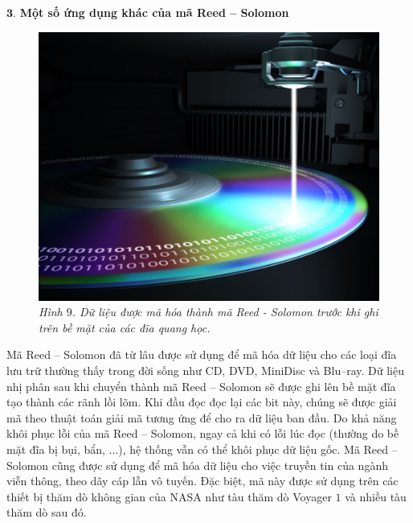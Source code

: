 \begin{multicols}{2}
\begin{figure}[H]
		\vspace*{-10pt}
	\end{figure}
	$\pmb{3.}$ \textbf{\color{toanhocdoisong}Một số ứng dụng khác của mã Reed -- Solomon}
	\begin{figure}[H]
		\vspace*{-5pt}
		\centering
		\captionsetup{labelformat= empty, justification=centering}
		\includegraphics[width= 1\linewidth]{17}
		\caption{\small\textit{\color{toanhocdoisong}Hình $9$. Dữ liệu được mã hóa thành mã Reed - Solomon trước khi ghi trên bề mặt của các đĩa quang học.}}
		\vspace*{-10pt}
	\end{figure}
	Mã Reed -- Solomon đã từ lâu được sử dụng để mã hóa dữ liệu cho các loại đĩa lưu trữ thường thấy trong đời sống như CD, DVD, MiniDisc và Blu--ray. Dữ liệu nhị phân sau khi chuyển thành mã Reed -- Solomon sẽ được ghi lên bề mặt đĩa tạo thành các rãnh lồi lõm. Khi đầu đọc đọc lại các bit này, chúng sẽ được giải mã theo thuật toán giải mã tương ứng để cho ra dữ liệu ban đầu. Do khả năng khôi phục lỗi của mã Reed -- Solomon, ngay cả khi có lỗi lúc đọc (thường do bề mặt đĩa bị bụi, bẩn, ...), hệ thống vẫn có thể khôi phục dữ liệu gốc.
	\vskip 0.1cm
	Mã Reed -- Solomon cũng được sử dụng để mã hóa dữ liệu cho việc truyền tin của ngành viễn thông, theo dây cáp lẫn vô tuyến. Đặc biệt, mã này được sử dụng trên các thiết bị thăm dò không gian của NASA như tàu thăm dò Voyager $1$ và nhiều tàu thăm dò sau đó.
	\begin{figure}[H]
		\vspace*{-5pt}
		\centering

\end{figure}
\end{multicols}
